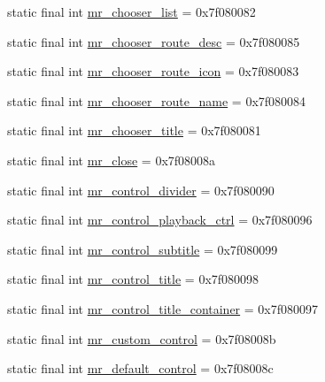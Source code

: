 \begin{CompactItemize}
\item 
static final int \hyperlink{classcom_1_1companyname_1_1x__2doo_1_1_r_1_1id_ea5f22149d71e84b8e88e3a567d6e027}{mr\_\-chooser\_\-list} = 0x7f080082
\item 
static final int \hyperlink{classcom_1_1companyname_1_1x__2doo_1_1_r_1_1id_f1d4a889be431fa87118baceabd7575a}{mr\_\-chooser\_\-route\_\-desc} = 0x7f080085
\item 
static final int \hyperlink{classcom_1_1companyname_1_1x__2doo_1_1_r_1_1id_fd8c53247c3d16076c079e4e95a0b731}{mr\_\-chooser\_\-route\_\-icon} = 0x7f080083
\item 
static final int \hyperlink{classcom_1_1companyname_1_1x__2doo_1_1_r_1_1id_60207c69d366012a3f136f525a18f69b}{mr\_\-chooser\_\-route\_\-name} = 0x7f080084
\item 
static final int \hyperlink{classcom_1_1companyname_1_1x__2doo_1_1_r_1_1id_bbd9921f2314adf7a259a59fd668cfb8}{mr\_\-chooser\_\-title} = 0x7f080081
\item 
static final int \hyperlink{classcom_1_1companyname_1_1x__2doo_1_1_r_1_1id_571c91afc9126c091d61a136a956f194}{mr\_\-close} = 0x7f08008a
\item 
static final int \hyperlink{classcom_1_1companyname_1_1x__2doo_1_1_r_1_1id_699e1a8ddd052cacfdf7854312687515}{mr\_\-control\_\-divider} = 0x7f080090
\item 
static final int \hyperlink{classcom_1_1companyname_1_1x__2doo_1_1_r_1_1id_dcd3c0a0a20d0fde73aa1ef825ae9b77}{mr\_\-control\_\-playback\_\-ctrl} = 0x7f080096
\item 
static final int \hyperlink{classcom_1_1companyname_1_1x__2doo_1_1_r_1_1id_d6ca2a28dfafb1b852605cff004f26f2}{mr\_\-control\_\-subtitle} = 0x7f080099
\item 
static final int \hyperlink{classcom_1_1companyname_1_1x__2doo_1_1_r_1_1id_72bd41aa5c0ec683339440c38bca3df4}{mr\_\-control\_\-title} = 0x7f080098
\item 
static final int \hyperlink{classcom_1_1companyname_1_1x__2doo_1_1_r_1_1id_3226d835c4384761f41e614d035be0c9}{mr\_\-control\_\-title\_\-container} = 0x7f080097
\item 
static final int \hyperlink{classcom_1_1companyname_1_1x__2doo_1_1_r_1_1id_ecf9604ba0278e25f4ebab4e38db67b0}{mr\_\-custom\_\-control} = 0x7f08008b
\item 
static final int \hyperlink{classcom_1_1companyname_1_1x__2doo_1_1_r_1_1id_91463e168a1c5e38a2e592b33720a580}{mr\_\-default\_\-control} = 0x7f08008c
\item 

\end{CompactItemize}
